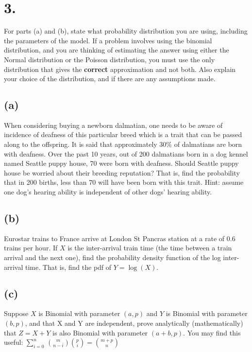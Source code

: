 \documentclass{article}
\begin{document}
\section*{3.}
{\Large

For parts (a) and (b), state what probability distribution you are using, including the parameters of the model.
If  a problem involves using the binomial distribution, and you are thinking of estimating the answer using either the Normal distribution or the Poisson distribution, you must use the only distribution that gives the {\bf{correct}} approximation and not both. Also explain your choice of the distribution, and if there are any assumptions made. 

\subsection*{(a)}
When considering buying a newborn dalmatian, one needs to be aware of incidence of deafness of this particular breed which is a trait that can be passed along to the offspring.  It is said that approximately 30\% of dalmatians are born with deafness. Over the past 10 years, out of 200 dalmatians born in a dog kennel named Seattle puppy house, 70 were born with deafness. Should  Seattle puppy house be worried about their breeding reputation? That is, find the probability that in 200 births, less than 70 will have been born with this trait. Hint: assume one dog's hearing ability is independent of other dogs' hearing ability.

\subsection*{(b)}
Eurostar trains to France arrive at London St Pancras station at a rate of $0.6$ trains per  hour. If $X$ is the inter-arrival train time (the time between a train arrival and the next one), find the probability density function of the log inter-arrival time. That is, find the pdf of $Y=\log(X).$

\subsection*{(c)}
Suppose $X$ is Binomial with parameter $(a,p)$ and $Y$ is Binomial with parameter $(b,p)$, and that X and Y are independent, prove analytically (mathematically) that  $Z=X+Y$ is also Binomial with parameter $(a+b,p).$ You may find this useful: $\sum_{i=0}^{n}\,{{ m}\choose{n- i}}{ p\choose i } = {{m+p}\choose n}$

}
\end{document}
